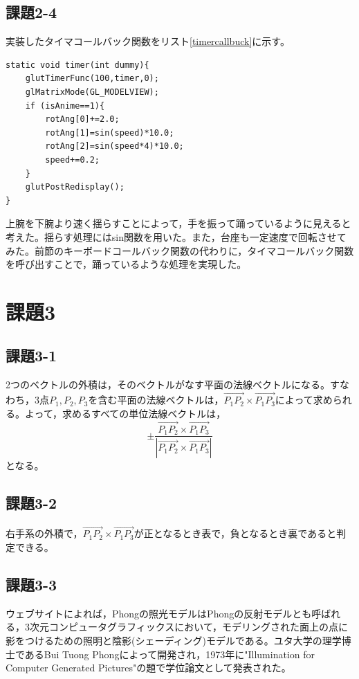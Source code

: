 \documentclass[]{jsarticle}
\begin{document}
\subsection{課題2-4}
実装したタイマコールバック関数をリスト\ref{timercallbuck}に示す。
\begin{lstlisting}[caption=タイマコールバック関数,label=timercallbuck]
static void timer(int dummy){
	glutTimerFunc(100,timer,0);
	glMatrixMode(GL_MODELVIEW);
	if (isAnime==1){
		rotAng[0]+=2.0;
		rotAng[1]=sin(speed)*10.0;
		rotAng[2]=sin(speed*4)*10.0;
		speed+=0.2;
	}
	glutPostRedisplay();
}
\end{lstlisting}
上腕を下腕より速く揺らすことによって，手を振って踊っているように見えると考えた。揺らす処理にはsin関数を用いた。また，台座も一定速度で回転させてみた。前節のキーボードコールバック関数の代わりに，タイマコールバック関数を呼び出すことで，踊っているような処理を実現した。


\section{課題3}
\subsection{課題3-1}
2つのベクトルの外積は，そのベクトルがなす平面の法線ベクトルになる。すなわち，3点$P_1,P_2,P_3$を含む平面の法線ベクトルは，$\overrightarrow{P_1 P_2}\times\overrightarrow{P_1 P_3}$によって求められる。よって，求めるすべての単位法線ベクトルは，
$$
\pm\frac{\overrightarrow{P_1 P_2}\times\overrightarrow{P_1 P_3}}{|\overrightarrow{P_1 P_2}\times\overrightarrow{P_1 P_3}|}
$$
となる。
\subsection{課題3-2}
右手系の外積で，$\overrightarrow{P_1 P_2}\times\overrightarrow{P_1 P_3}$が正となるとき表で，負となるとき裏であると判定できる。
\subsection{課題3-3}
ウェブサイト\cite{4}によれば，Phongの照光モデルはPhongの反射モデルとも呼ばれる，3次元コンピュータグラフィックスにおいて，モデリングされた面上の点に影をつけるための照明と陰影(シェーディング)モデルである。ユタ大学の理学博士であるBui Tuong Phongによって開発され，1973年に"Illumination for Computer Generated Pictures"の題で学位論文として発表された。
\end{document}
